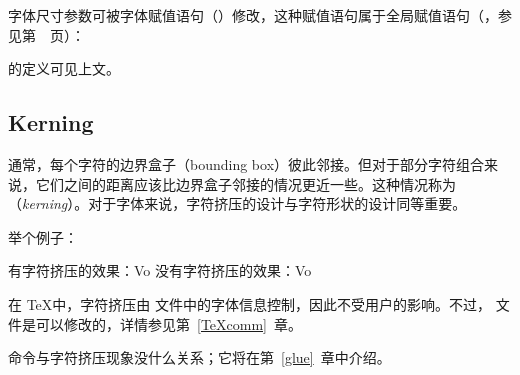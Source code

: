 \documentclass{book}
\begin{document}
字体尺寸参数可被字体赋值语句（）修改，这种赋值语句属于全局赋值语句（，参见第~\pageref{global:assign}~页）：
\begin{Disp}\end{Disp}
 的定义可见上文。

\subsection{Kerning}

通常，每个字符的边界盒子（bounding box）彼此邻接。但对于部分字符组合来说，它们之间的距离应该比边界盒子邻接的情况更近一些。这种情况称为（\emph{kerning}）。对于字体来说，字符挤压的设计与字符形状的设计同等重要。

举个例子：
\begin{Disp} 有字符挤压的效果：Vo \quad 没有字符挤压的效果：V\hbox{}o\end{Disp}

在 \TeX 中，字符挤压由  文件中的字体信息控制，因此不受用户的影响。不过， 文件是可以修改的，详情参见第~\ref{TeXcomm}~章。

 命令与字符挤压现象没什么关系；它将在第~\ref{glue}~章中介绍。

\end{document}
